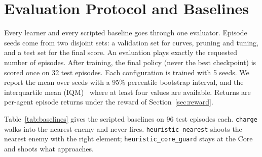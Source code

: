 \documentclass[11pt]{article}
\begin{document}
\section{Evaluation Protocol and Baselines}
\label{sec:protocol}

Every learner and every scripted baseline goes through one evaluator. Episode seeds come from two disjoint sets: a validation set for curves, pruning and tuning, and a test set for the final score. An evaluation plays exactly the requested number of episodes. After training, the final policy (never the best checkpoint) is scored once on 32 test episodes. Each configuration is trained with 5 seeds. We report the mean over seeds with a 95\% percentile bootstrap interval, and the interquartile mean (IQM)~\cite{agarwal2021rliable} where at least four values are available. Returns are per-agent episode returns under the reward of Section~\ref{sec:reward}.

Table~\ref{tab:baselines} gives the scripted baselines on 96 test episodes each. \texttt{charge} walks into the nearest enemy and never fires. \texttt{heuristic\_nearest} shoots the nearest enemy with the right element; \texttt{heuristic\_core\_guard} stays at the Core and shoots what approaches.
\end{document}
